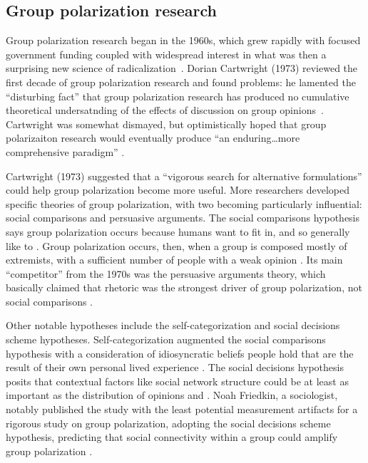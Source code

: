 \documentclass[preview]{article}
\begin{document}
\subsection{Group polarization research}

Group polarization research began in the 1960s, which grew rapidly with
focused government funding coupled with widespread
interest in what was then a surprising new science of
radicalization~\cite{Cartwright1971}. Dorian Cartwright (1973) reviewed the
first decade of group polarization research and found problems: he lamented
the ``disturbing fact'' that group polarization research has produced no
cumulative theoretical undersatnding of the effects of discussion on
group opinions~\cite{Cartwright1973}. Cartwright was somewhat dismayed, but
optimistically hoped that group polarizaiton research would eventually
produce ``an enduring\ldots more comprehensive paradigm'' \cite[p.
230]{Cartwright1973}.

Cartwright (1973) suggested that a ``vigorous search for alternative
formulations'' could help group polarization become more useful. More
researchers developed specific theories of group
polarization, with two becoming particularly influential: social comparisons
and persuasive arguments. The social comparisons hypothesis says group
polarization occurs because humans want to fit in, and so generally like to . Group polarization occurs, then, when a
group is composed mostly of extremists, with a sufficient number of people
with a weak opinion \cite{Myers1970,Myers1975}. Its main
“competitor” from the 1970s was the persuasive arguments theory, which
basically claimed that rhetoric was the strongest driver of group
polarization, not social comparisons \cite{Burnstein1973,Burnstein1975}.

Other notable hypotheses include the
self-categorization and social decisions scheme hypotheses.
Self-categorization augmented the social comparisons hypothesis with a
consideration of idiosyncratic beliefs people hold that are the result of
their own personal lived experience \cite{Abrams1990,Hogg1990}.
The social decisions hypothesis posits that contextual factors like
social network structure could be at least as important as the distribution
of opinions and . Noah Friedkin, a sociologist, notably published
the study with the least potential measurement artifacts for a rigorous study on group polarization, adopting the social
decisions scheme hypothesis, predicting that social connectivity within a
group could amplify group polarization \cite{Friedkin1999}.
\end{document}
